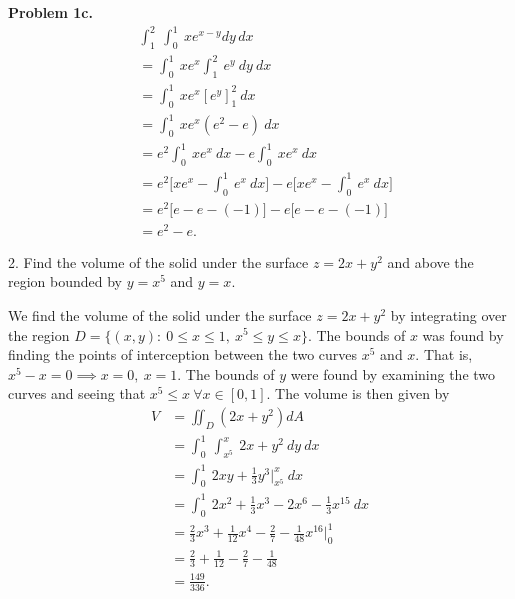 \documentclass{report}
\begin{document}
    \pagebreak 
    \textbf{Problem 1c.}
    \begin{align*}
        &\int_{1}^{2}\ \int_{0}^{1}\ xe^{x-y} dy\, dx \\
        &=\int_{0}^{1}\ xe^{x}\int_{1}^{2}\ e^{y}\ dy\ dx \\
        &=\int_{0}^{1}\ xe^{x}[e^{y}]_{1}^{2}\ dx \\
        &=\int_{0}^{1}\ xe^{x}(e^{2}-e)\ dx \\
        &=e^{2}\int_{0}^{1}\ xe^{x}\ dx - e\int_{0}^{1}\ xe^{x}\ dx \\
        &=e^{2}\bigg[xe^{x}-\int_{0}^{1}\ e^{x}\ dx\bigg] - e\bigg[xe^{x} -\int_{0}^{1}\ e^{x}\ dx\bigg] \\
        &=e^{2}\bigg[e-e -(-1)\bigg] - e\bigg[e-e -(-1)\bigg] \\
        &= e^{2} - e
    .\end{align*}

    \bigbreak \noindent 
    \begin{mdframed}
        2. Find the volume of the solid under the surface $z = 2x + y^2$ and above the region bounded by $y = x^{5}$ and $y = x$. 
    \end{mdframed}
    \bigbreak \noindent 
    We find the volume of the solid under the surface $z=2x+y^2$ by integrating over the region $D = \{(x,y):\ 0 \leq x \leq 1,\ x^{5} \leq y \leq x\} $. The bounds of $x$ was found by finding the points of interception between the two curves $x^{5}$ and $x$. That is, $x^{5} -x = 0 \implies x = 0,\ x= 1$. The bounds of $y$ were found by examining the two curves and seeing that $x^{5} \leq x\ \forall x \in [0,1] $. 
    \bigbreak \noindent 
    The volume is then given by
    \begin{align*}
        V &=\iint_{D}(2x+y^{2})dA \\
        &=\int_{0}^{1}\ \int_{x^{5}}^{x}\ 2x+y^{2}\ dy\ dx \\
        &=\int_{0}^{1}\ 2xy + \frac{1}{3}y^{3}\bigg|^{x}_{x^{5}}\ dx \\
        &=\int_{0}^{1}\ 2x^{2} + \frac{1}{3}x^{3} - 2x^{6} - \frac{1}{3}x^{15}\ dx \\
        &=\frac{2}{3}x^{3} + \frac{1}{12}x^{4} - \frac{2}{7} - \frac{1}{48}x^{16}\bigg|^{1}_{0} \\
        &=\frac{2}{3} + \frac{1}{12} - \frac{2}{7} - \frac{1}{48} \\
        &=\frac{149}{336}
    .\end{align*}
\end{document}
